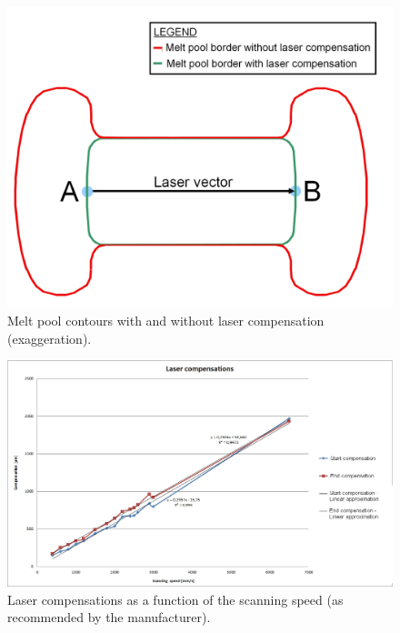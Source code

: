 \begin{figure}[th]
\centering
\includegraphics[scale=0.3]{Images/Compens}
\decoRule
\caption[Melt pool contours with and without laser compensation (exaggeration)]{Melt pool contours with and without laser compensation (exaggeration).}
\label{fig:Compens}
\end{figure}

\begin{figure}[th]
\centering
\includegraphics[scale=0.45]{Images/Compens1}
\decoRule
\caption[Laser compensations as a function of the scanning speed (as recommended by the manufacturer)]{Laser compensations as a function of the scanning speed (as recommended by the manufacturer).}
\label{fig:Compens}
\end{figure}


